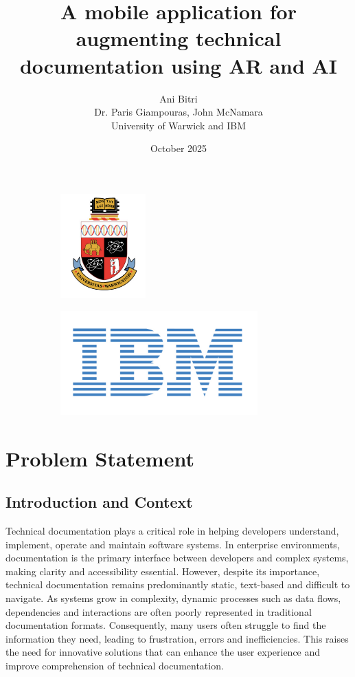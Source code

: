 \documentclass[12pt]{article}
\title{\textbf{A mobile application for augmenting technical documentation using AR and AI}}
\author{Ani Bitri\\ \small Dr. Paris Giampouras, John McNamara\\ \small University of Warwick and IBM}
\begin{document}
\begin{figure}
    \centering
    \begin{subfigure}[b]{0.45\textwidth}
        \centering
        \includegraphics[height=4cm]{img/WarwickCrest.png}
        \label{fig:WarwickCrest}
    \end{subfigure}
    \hfill
    \begin{subfigure}[b]{0.45\textwidth}
        \centering
        \includegraphics[height=4cm]{img/IBM_Logo.png}
        \label{fig:IBM_Logo}
    \end{subfigure}
\end{figure}

\date{October 2025}
\maketitle

\newpage

\section{Problem Statement}

    \subsection{Introduction and Context}

        Technical documentation plays a critical role in helping developers understand, implement, operate and maintain software systems. In enterprise environments, documentation is the primary interface between developers and complex
        systems, making clarity and accessibility essential. However, despite its importance, technical documentation remains predominantly static, text-based and difficult to navigate. As systems grow in complexity, dynamic processes such
        as data flows, dependencies and interactions are often poorly represented in traditional documentation formats. Consequently, many users often struggle to find the information they need, leading to frustration, errors and inefficiencies. This 
        raises the need for innovative solutions that can enhance the user experience and improve comprehension of technical documentation.
\end{document}
